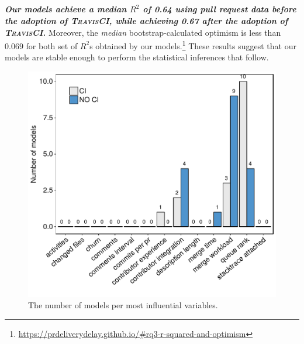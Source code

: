 \subsection*{\textbf{\RQthree}}

\textit{\textbf{Our models achieve a median $R^2$ of 0.64 using pull request
data \textit{before} the adoption of \textsc{TravisCI}, while achieving 0.67 \textit{after} the adoption of \textsc{TravisCI}.}} Moreover, the
\textit{median} bootstrap-calculated optimism is less than $0.069$ for both set
of $R^2$s obtained by our models.\footnote{\url{https://prdeliverydelay.github.io/\#rq3-r-squared-and-optimism}} 
These results suggest that our models are stable enough to perform the
statistical inferences that follow.

\begin{figure}[!t]
	\centering
	\includegraphics[width=.60\columnwidth,keepaspectratio]{influential_variables_per_project.pdf}
	\caption{The number of models per most influential variables.}
	\label{fig:number_of_projects_by_influential_variables}
\end{figure}

